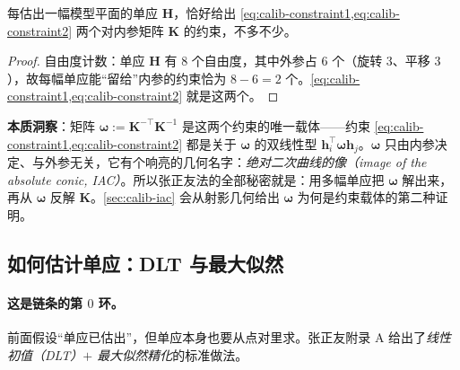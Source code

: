 \begin{proposition}[一幅单应只给两个内参约束]\label{prop:calib-two-constraints}
每估出一幅模型平面的单应 $\mathbf{H}$，恰好给出 \cref{eq:calib-constraint1,eq:calib-constraint2} 两个对内参矩阵 $\mathbf{K}$ 的约束，不多不少。
\end{proposition}
\begin{proof}
自由度计数：单应 $\mathbf{H}$ 有 $8$ 个自由度，其中外参占 $6$ 个（旋转 $3$、平移 $3$），故每幅单应能“留给”内参的约束恰为 $8-6=2$ 个。\cref{eq:calib-constraint1,eq:calib-constraint2} 就是这两个。
\end{proof}

\begin{insight}
\textbf{本质洞察}：矩阵 $\boldsymbol{\omega}:=\mathbf{K}^{-\top}\mathbf{K}^{-1}$ 是这两个约束的唯一载体——约束 \cref{eq:calib-constraint1,eq:calib-constraint2} 都是关于 $\boldsymbol{\omega}$ 的双线性型 $\mathbf{h}_i^\top\boldsymbol{\omega}\mathbf{h}_j$。$\boldsymbol{\omega}$ 只由内参决定、与外参无关，它有个响亮的几何名字：\emph{绝对二次曲线的像（image of the absolute conic, IAC）}。所以张正友法的全部秘密就是：用多幅单应把 $\boldsymbol{\omega}$ 解出来，再从 $\boldsymbol{\omega}$ 反解 $\mathbf{K}$。\cref{sec:calib-iac} 会从射影几何给出 $\boldsymbol{\omega}$ 为何是约束载体的第二种证明。
\end{insight}

\subsection{如何估计单应：DLT 与最大似然}
\label{sec:calib-homography-estimate}

\paragraph{这是链条的第 $0$ 环。}
前面假设“单应已估出”，但单应本身也要从点对里求。张正友附录 A\cite{zhang2000calibration} 给出了\emph{线性初值（DLT）$+$ 最大似然精化}的标准做法。

